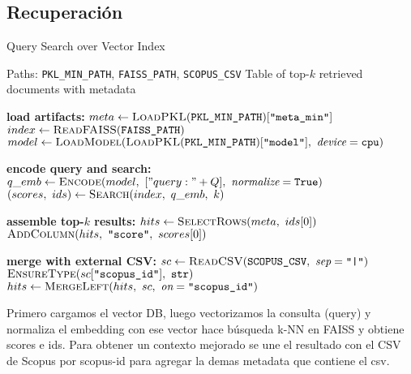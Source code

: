 \subsection{Recuperación}\label{subsec:recuperacion}
\begin{algorithmEN}[H]
  \caption{Query Search over Vector Index}
  \begin{algorithmic}[1]
    \Require Paths: \texttt{PKL\_MIN\_PATH}, \texttt{FAISS\_PATH}, \texttt{SCOPUS\_CSV}
    \Ensure Table of top-$k$ retrieved documents with metadata

    \Statex \textbf{load artifacts:}
    \State \quad $meta \gets \textsc{LoadPKL}(\texttt{PKL\_MIN\_PATH})[\texttt{"meta\_min"}]$
    \State \quad $index \gets \textsc{ReadFAISS}(\texttt{FAISS\_PATH})$
    \State \quad $model \gets \textsc{LoadModel}(\textsc{LoadPKL}(\texttt{PKL\_MIN\_PATH})[\texttt{"model"}],\ \textit{device}=\texttt{cpu})$

    \Statex \textbf{encode query and search:}
    \State \quad $q\_emb \gets \textsc{Encode}(model,\ ["query: "+Q],\ \textit{normalize}=\texttt{True})$
    \State \quad $(scores,\ ids) \gets \textsc{Search}(index,\ q\_emb,\ k)$ 

    \Statex \textbf{assemble top-$k$ results:}
    \State \quad $hits \gets \textsc{SelectRows}(meta,\ ids[0])$
    \State \quad $\textsc{AddColumn}(hits,\ \texttt{"score"},\ scores[0])$

    \Statex \textbf{merge with external CSV:}
    \State \quad $sc \gets \textsc{ReadCSV}(\texttt{SCOPUS\_CSV},\ \textit{sep}=\texttt{"|"})$ 
    \State \quad $\textsc{EnsureType}(sc[\texttt{"scopus\_id"}],\ \texttt{str})$
    \State \quad $hits \gets \textsc{MergeLeft}(hits,\ sc,\ \textit{on}=\texttt{"scopus\_id"})$
  \end{algorithmic}
  \label{alg:search_vector_index}
\end{algorithmEN}

Primero cargamos el vector DB, luego vectorizamos  la consulta (query) y normaliza el embedding con ese vector hace búsqueda k-NN en FAISS y obtiene scores e ids.
Para obtener un contexto mejorado se une el resultado con el CSV de Scopus por scopus-id para agregar la demas metadata que contiene el csv.
